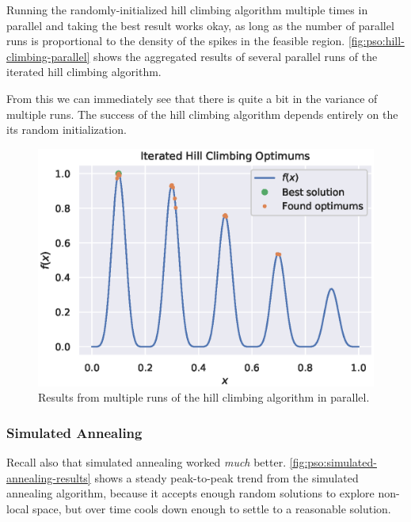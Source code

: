 \documentclass[12pt]{article}
\begin{document}
Running the randomly-initialized hill climbing algorithm multiple times in parallel and taking the best result works okay, as long as the number of parallel runs is proportional to the density of the spikes in the feasible region.
\autoref{fig:pso:hill-climbing-parallel} shows the aggregated results of several parallel runs of the iterated hill climbing algorithm.

From this we can immediately see that there is quite a bit in the variance of multiple runs.
The success of the hill climbing algorithm depends entirely on the its random initialization.

\begin{figure}[H]
    \centering
    \includegraphics{figures/prob1-hill-climbing-solution.eps}
    \caption{Results from multiple runs of the hill climbing algorithm in parallel.}\label{fig:pso:hill-climbing-parallel}
\end{figure}

\subsubsection{Simulated Annealing}
Recall also that simulated annealing worked \textit{much} better.
\autoref{fig:pso:simulated-annealing-results} shows a steady peak-to-peak trend from the simulated annealing algorithm, because it accepts enough random solutions to explore non-local space, but over time cools down enough to settle to a reasonable solution.
\end{document}
